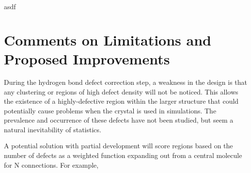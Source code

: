 asdf

\section{Comments on Limitations and Proposed Improvements}

During the hydrogen bond defect correction step, a weakness in the design is that any clustering or regions of high defect density will not be noticed.
This allows the existence of a highly-defective region within the larger structure that could potentially cause problems when the crystal is used in simulations. 
The prevalence and occurrence of these defects have not been studied, but seem a natural inevitability of statistics. 

A potential solution with partial development will score regions based on the number of defects as a weighted function expanding out from a central molecule for N connections. 
For example, 












